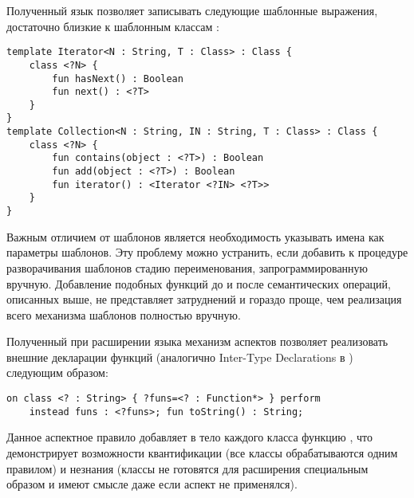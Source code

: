 Полученный язык позволяет записывать следующие шаблонные выражения, достаточно близкие к шаблонным классам :
\begin{lstlisting}
template Iterator<N : String, T : Class> : Class {
	class <?N> {
		fun hasNext() : Boolean
		fun next() : <?T>
	}
}
template Collection<N : String, IN : String, T : Class> : Class {
	class <?N> {
		fun contains(object : <?T>) : Boolean
		fun add(object : <?T>) : Boolean
		fun iterator() : <Iterator <?IN> <?T>>
	}
}
\end{lstlisting}
Важным отличием от шаблонов  является необходимость указывать имена как параметры шаблонов. Эту проблему можно устранить, если добавить к процедуре разворачивания шаблонов стадию переименования, запрограммированную вручную. Добавление подобных функций до и после семантических операций, описанных выше, не представляет затруднений и гораздо проще, чем реализация всего механизма шаблонов полностью вручную.

Полученный при расширении языка  механизм аспектов позволяет реализовать внешние декларации функций (аналогично Inter-Type Declarations в ) следующим образом:
\begin{lstlisting}
on class <? : String> { ?funs=<? : Function*> } perform
	instead funs : <?funs>; fun toString() : String;
\end{lstlisting}
Данное аспектное правило добавляет в тело каждого класса функцию , что демонстрирует возможности квантификации (все классы обрабатываются одним правилом) и незнания (классы не готовятся для расширения специальным образом и имеют смысле даже если аспект не применялся).